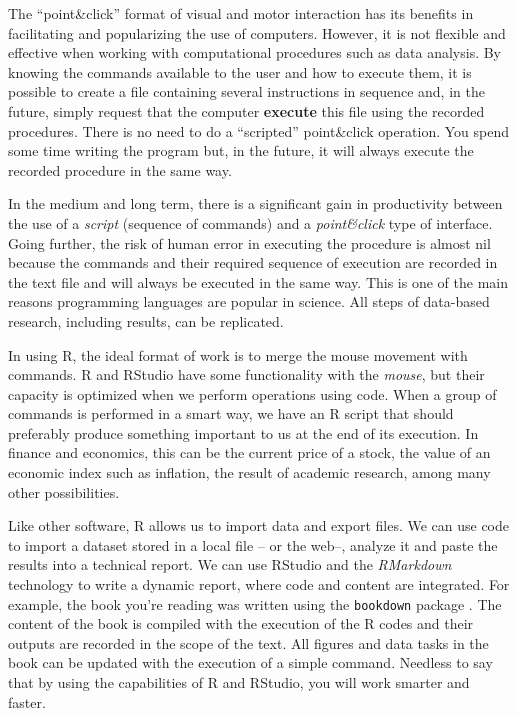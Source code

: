 \documentclass[
  12pt,
]{book}
\begin{document}
The ``point\&click'' format of visual and motor interaction has its benefits in facilitating and popularizing the use of computers. However, it is not flexible and effective when working with computational procedures such as data analysis. By knowing the commands available to the user and how to execute them, it is possible to create a file containing several instructions in sequence and, in the future, simply request that the computer \textbf{execute} this file using the recorded procedures. There is no need to do a ``scripted'' point\&click operation. You spend some time writing the program but, in the future, it will always execute the recorded procedure in the same way.

In the medium and long term, there is a significant gain in productivity between the use of a \emph{script} (sequence of commands) and a \emph{point\&click} type of interface. Going further, the risk of human error in executing the procedure is almost nil because the commands and their required sequence of execution are recorded in the text file and will always be executed in the same way. This is one of the main reasons programming languages are popular in science. All steps of data-based research, including results, can be replicated.

In using R, the ideal format of work is to merge the mouse movement with commands. R and RStudio have some functionality with the \emph{mouse}, but their capacity is optimized when we perform operations using code. When a group of commands is performed in a smart way, we have an R script that should preferably produce something important to us at the end of its execution. In finance and economics, this can be the current price of a stock, the value of an economic index such as inflation, the result of academic research, among many other possibilities.

Like other software, R allows us to import data and export files. We can use code to import a dataset stored in a local file -- or the web--, analyze it and paste the results into a technical report. We can use RStudio and the \emph{RMarkdown} technology to write a dynamic report, where code and content are integrated. For example, the book you're reading was written using the \texttt{bookdown} package \citep{R-bookdown}. The content of the book is compiled with the execution of the R codes and their outputs are recorded in the scope of the text. All figures and data tasks in the book can be updated with the execution of a simple command. Needless to say that by using the capabilities of R and RStudio, you will work smarter and faster.  
\end{document}
